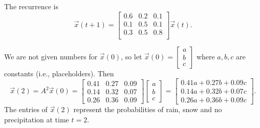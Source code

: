 \documentclass[../main.tex]{subfiles}
\begin{document}
\begin{exercise}
\begin{solution}

    The recurrence is 
    \[
      \vec{x}(t+1) = 
      \begin{bmatrix}
        0.6 & 0.2 & 0.1 \\
        0.1 & 0.5 & 0.1 \\
        0.3 & 0.5 & 0.8 \\
      \end{bmatrix}
      \vec{x}(t).
    \]

  \end{solution}

  We are not given numbers for \(\vec{x}(0)\), so let \(\vec{x}(0) = \begin{bmatrix} a \\ b \\ c \end{bmatrix}\) where \(a,b,c\) are constants (i.e., placeholders). Then
  \[
    \vec{x}(2) = A^{2} \vec{x}(0) = 
    \begin{bmatrix}
      0.41 & 0.27 & 0.09 \\
      0.14 & 0.32 & 0.07 \\
      0.26 & 0.36 & 0.09
    \end{bmatrix}
    \begin{bmatrix}
      a \\
      b \\
      c 
    \end{bmatrix} =
    \begin{bmatrix}
      0.41 a + 0.27 b + 0.09 c \\
      0.14 a + 0.32 b + 0.07 c \\
      0.26 a + 0.36 b + 0.09 c
    \end{bmatrix}.
  \]
  The entries of \(\vec{x}(2)\) represent the probabilities of rain, snow and no precipitation at time \(t = 2\).

\end{exercise}
\end{document}
